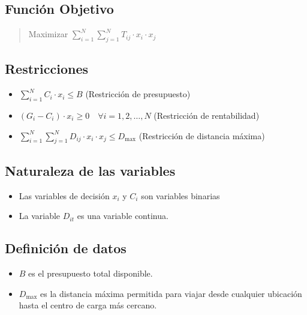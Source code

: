 \documentclass[letterpaper]{article}
\begin{document}
\begin{flushleft}
		\subsection{Función Objetivo}
		\begin{quote}
			\begin{center}
				Maximizar $\sum_{i=1}^{N}\sum_{j=1}^{N} T_{ij} \cdot x_i \cdot x_j$
			\end{center}
		\end{quote}
		\subsection{Restricciones}
		\begin{itemize}
			\item $\sum_{i=1}^{N} C_i \cdot x_i \leq B$ (Restricción de presupuesto)
			\item $(G_i - C_i) \cdot x_i \geq 0 \quad \forall i=1,2,\ldots,N$ (Restricción de rentabilidad)
			\item $\sum_{i=1}^{N} \sum_{j=1}^{N} D_{ij} \cdot x_i \cdot x_j \leq D_{\text{max}}$ (Restricción de distancia máxima)
		\end{itemize}
		\subsection{Naturaleza de las variables}
		\begin{itemize}
			\item Las variables de decisión $x_i$ y $C_i$ son variables binarias
			\item La variable $D_{it}$ es una variable continua.
		\end{itemize}
		\subsection{Definición de datos}
		\begin{itemize}
			\item $B$ es el presupuesto total disponible.
			\item $D_{\text{max}}$ es la distancia máxima permitida para viajar desde cualquier ubicación hasta el centro de carga más cercano.
		\end{itemize}
		
	\end{flushleft}
	
\end{document}
